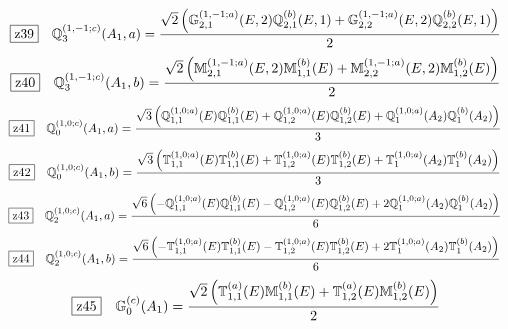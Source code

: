 \documentclass[fleqn,10pt,landscape]{jsarticle}
\begin{document}
\begin{dmath*}
\hspace*{3mm}\fbox{z39}\quad \mathbb{Q}_{3}^{(1,-1;c)}(A_{1},a)=\frac{\sqrt{2} \left(\mathbb{G}_{2,1}^{(1,-1;a)}(E,2) \mathbb{Q}_{2,1}^{(b)}(E,1) + \mathbb{G}_{2,2}^{(1,-1;a)}(E,2) \mathbb{Q}_{2,2}^{(b)}(E,1)\right)}{2}
\end{dmath*}
\begin{dmath*}
\hspace*{3mm}\fbox{z40}\quad \mathbb{Q}_{3}^{(1,-1;c)}(A_{1},b)=\frac{\sqrt{2} \left(\mathbb{M}_{2,1}^{(1,-1;a)}(E,2) \mathbb{M}_{1,1}^{(b)}(E) + \mathbb{M}_{2,2}^{(1,-1;a)}(E,2) \mathbb{M}_{1,2}^{(b)}(E)\right)}{2}
\end{dmath*}
\begin{dmath*}
\hspace*{3mm}\fbox{z41}\quad \mathbb{Q}_{0}^{(1,0;c)}(A_{1},a)=\frac{\sqrt{3} \left(\mathbb{Q}_{1,1}^{(1,0;a)}(E) \mathbb{Q}_{1,1}^{(b)}(E) + \mathbb{Q}_{1,2}^{(1,0;a)}(E) \mathbb{Q}_{1,2}^{(b)}(E) + \mathbb{Q}_{1}^{(1,0;a)}(A_{2}) \mathbb{Q}_{1}^{(b)}(A_{2})\right)}{3}
\end{dmath*}
\begin{dmath*}
\hspace*{3mm}\fbox{z42}\quad \mathbb{Q}_{0}^{(1,0;c)}(A_{1},b)=\frac{\sqrt{3} \left(\mathbb{T}_{1,1}^{(1,0;a)}(E) \mathbb{T}_{1,1}^{(b)}(E) + \mathbb{T}_{1,2}^{(1,0;a)}(E) \mathbb{T}_{1,2}^{(b)}(E) + \mathbb{T}_{1}^{(1,0;a)}(A_{2}) \mathbb{T}_{1}^{(b)}(A_{2})\right)}{3}
\end{dmath*}
\begin{dmath*}
\hspace*{3mm}\fbox{z43}\quad \mathbb{Q}_{2}^{(1,0;c)}(A_{1},a)=\frac{\sqrt{6} \left(- \mathbb{Q}_{1,1}^{(1,0;a)}(E) \mathbb{Q}_{1,1}^{(b)}(E) - \mathbb{Q}_{1,2}^{(1,0;a)}(E) \mathbb{Q}_{1,2}^{(b)}(E) + 2 \mathbb{Q}_{1}^{(1,0;a)}(A_{2}) \mathbb{Q}_{1}^{(b)}(A_{2})\right)}{6}
\end{dmath*}
\begin{dmath*}
\hspace*{3mm}\fbox{z44}\quad \mathbb{Q}_{2}^{(1,0;c)}(A_{1},b)=\frac{\sqrt{6} \left(- \mathbb{T}_{1,1}^{(1,0;a)}(E) \mathbb{T}_{1,1}^{(b)}(E) - \mathbb{T}_{1,2}^{(1,0;a)}(E) \mathbb{T}_{1,2}^{(b)}(E) + 2 \mathbb{T}_{1}^{(1,0;a)}(A_{2}) \mathbb{T}_{1}^{(b)}(A_{2})\right)}{6}
\end{dmath*}
\begin{dmath*}
\hspace*{3mm}\fbox{z45}\quad \mathbb{G}_{0}^{(c)}(A_{1})=\frac{\sqrt{2} \left(\mathbb{T}_{1,1}^{(a)}(E) \mathbb{M}_{1,1}^{(b)}(E) + \mathbb{T}_{1,2}^{(a)}(E) \mathbb{M}_{1,2}^{(b)}(E)\right)}{2}
\end{dmath*}
\end{document}
